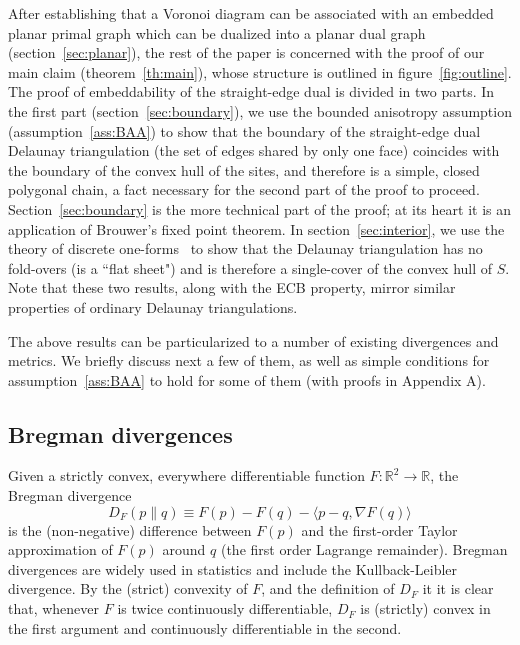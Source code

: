 \documentclass[11pt]{article}
\newcommand{\Sites}{S}
\begin{document}
After establishing that a Voronoi diagram can be associated with an embedded planar primal graph 
	which can be dualized into a planar dual graph (section~\ref{sec:planar}), 
	the rest of the paper is concerned with the proof of our main claim (theorem~\ref{th:main}), 
	whose structure is outlined in figure~\ref{fig:outline}. 
The proof of embeddability of the straight-edge dual is divided in two parts. 
In the first part (section~\ref{sec:boundary}), we use the bounded anisotropy assumption (assumption~\ref{ass:BAA})
	to show that the 
	 boundary of the straight-edge dual Delaunay triangulation 
	(the set of edges shared by only one face) coincides with the boundary of the convex hull of the sites, 
	and therefore is a simple, closed polygonal chain, a fact necessary for the second part of the proof to proceed. 
	Section~\ref{sec:boundary} is the more technical part of the proof; at its heart it is an application of Brouwer's fixed point theorem. 
In section~\ref{sec:interior}, we use the theory of discrete one-forms~\cite{1form} 
	to show that the Delaunay triangulation has no fold-overs (is a ``flat sheet") 
	and is therefore a single-cover of the convex hull of $\Sites$. 
Note that these two results, along with the ECB property, mirror similar properties of ordinary Delaunay triangulations. 


The above results can be particularized to a number of existing divergences and metrics. 
We briefly discuss next a few of them, as well as simple conditions for assumption~\ref{ass:BAA} to hold
	for some of them (with proofs in Appendix A). 







\subsection{Bregman divergences}\label{sec:DF}
Given a strictly convex, everywhere differentiable function $F:\mathbb{R}^2\rightarrow\mathbb{R}$, 
	the Bregman divergence
\begin{equation}\label{eq:defDF}
 D_F(p \parallel q) \equiv F(p) - F(q) - \langle p-q, \nabla F(q)\rangle 
\end{equation}
	is the (non-negative) difference between $F(p)$ and the first-order Taylor approximation of $F(p)$ around $q$
	(the first order Lagrange remainder). 
Bregman divergences are widely used in statistics and 
	include the Kullback-Leibler divergence. By the (strict) convexity of $F$, and the definition of $D_F$ it 
	it is clear that, whenever $F$ is twice continuously differentiable, 
	$D_F$ is (strictly) convex in the first argument and continuously differentiable in the second. 
\end{document}
